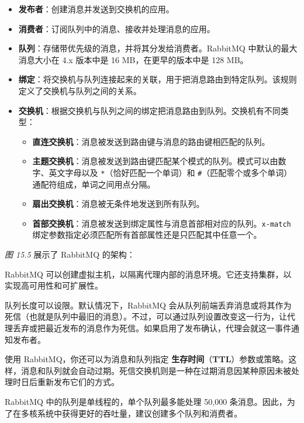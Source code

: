 \begin{itemize}
\item \textbf{发布者}：创建消息并发送到交换机的应用。
\item \textbf{消费者}：订阅队列中的消息、接收并处理消息的应用。
\item \textbf{队列}：存储带优先级的消息，并将其分发给消费者。RabbitMQ 中默认的最大消息大小在 4.x 版本中是 16 MB，在更早的版本中是 128 MB。
\item \textbf{绑定}：将交换机与队列连接起来的关联，用于把消息路由到特定队列。该规则定义了交换机与队列之间的关系。
\label{idx:1555}
\label{idx:1556}
\label{idx:1557}
\item \textbf{交换机}：根据交换机与队列之间的绑定把消息路由到队列。交换机有不同类型：

\begin{itemize}
\item \textbf{直连交换机}：消息被发送到路由键与消息的路由键相匹配的队列。
\item \textbf{主题交换机}：消息被发送到路由键匹配某个模式的队列。模式可以由数字、英文字母以及 \texttt{*}（恰好匹配一个单词）和 \texttt{\#}（匹配零个或多个单词）通配符组成，单词之间用点分隔。
\item \textbf{扇出交换机}：消息被无条件地发送到所有队列。
\item \textbf{首部交换机}：消息被发送到绑定属性与消息首部相对应的队列。\texttt{x-match} 绑定参数指定必须匹配所有首部属性还是只匹配其中任意一个。
\end{itemize}
\end{itemize}

\emph{图 15.5} 展示了 RabbitMQ 的架构：


\label{idx:1558}
RabbitMQ 可以创建虚拟主机，以隔离代理内部的消息环境。它还支持集群，以实现高可用性和可扩展性。

队列长度可以设限。默认情况下，RabbitMQ 会从队列前端丢弃消息或将其作为死信（也就是队列中最旧的消息）。不过，可以通过队列设置改变这一行为，让代理丢弃或把最近发布的消息作为死信。如果启用了发布确认，代理会就这一事件通知发布者。

\label{idx:1559}
使用 RabbitMQ，你还可以为消息和队列指定 \textbf{生存时间}（\textbf{TTL}）参数或策略。这样，消息和队列就会自动过期。死信交换机则是一种在过期消息因某种原因未被处理时日后重新发布它们的方式。

\label{idx:1560}
RabbitMQ 中的队列是单线程的，单个队列最多能处理 50,000 条消息。因此，为了在多核系统中获得更好的吞吐量，建议创建多个队列和消费者。

